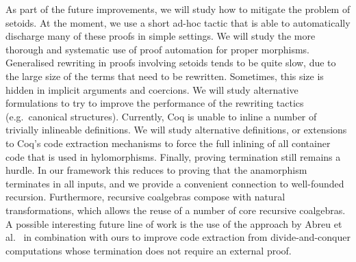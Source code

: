 \documentclass[a4paper,UKenglish,cleveref, autoref, thm-restate]{lipics-v2021}
\begin{document}
As part of the future improvements, we will study how to mitigate the problem of
setoids. At the moment, we use a short ad-hoc tactic that is able to
automatically discharge many of these proofs in simple settings.  We will study
the more thorough and systematic use of proof automation for proper morphisms.
Generalised rewriting in proofs involving setoids tends to be quite slow, due to
the large size of the terms that need to be rewritten. Sometimes, this size is
hidden in implicit arguments and coercions. We will study alternative
formulations to try to improve the performance of the rewriting tactics
(e.g.\ canonical structures).  Currently, Coq is unable to inline a number of
trivially inlineable definitions.  We will study alternative definitions, or
extensions to Coq's code extraction mechanisms to force the full inlining of all
container code that is used in hylomorphisms.  Finally, proving termination
still remains a hurdle. In our framework this reduces to proving that the
anamorphism terminates in all inputs, and we provide a convenient connection to
well-founded recursion. Furthermore, recursive coalgebras compose with natural
transformations, which allows the reuse of a number of core recursive
coalgebras. A possible interesting future line of work is the use of the
approach by Abreu et al.~\cite{AbreuDHJMS23} in combination with ours to improve
code extraction from divide-and-conquer computations whose termination does not
require an external proof.


\newpage


\end{document}
